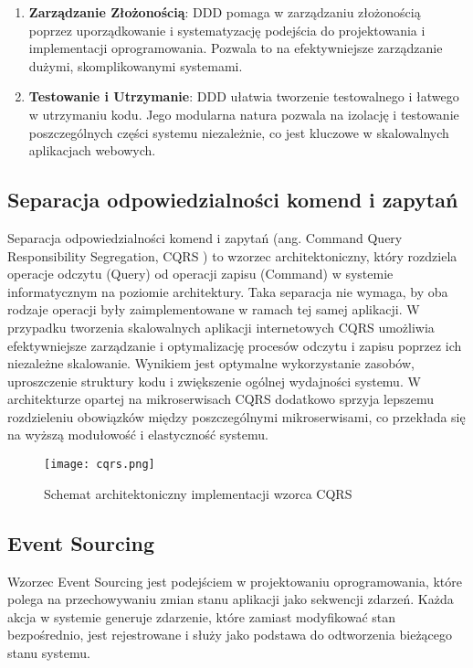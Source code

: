 \begin{enumerate}
    \item \textbf{Zarządzanie Złożonością}: DDD pomaga w zarządzaniu złożonością poprzez uporządkowanie i systematyzację podejścia do projektowania i implementacji oprogramowania. Pozwala to na efektywniejsze zarządzanie dużymi, skomplikowanymi systemami.

    \item \textbf{Testowanie i Utrzymanie}: DDD ułatwia tworzenie testowalnego i łatwego w utrzymaniu kodu. Jego modularna natura pozwala na izolację i testowanie poszczególnych części systemu niezależnie, co jest kluczowe w skalowalnych aplikacjach webowych.
\end{enumerate}

\subsection{Separacja odpowiedzialności komend i zapytań}

Separacja odpowiedzialności komend i zapytań (ang. Command Query Responsibility Segregation, CQRS \cite{cqrs}) to wzorzec architektoniczny, który rozdziela operacje odczytu (Query) od operacji zapisu (Command) w systemie informatycznym na poziomie architektury. Taka separacja nie wymaga, by oba rodzaje operacji były zaimplementowane w ramach tej samej aplikacji. W przypadku tworzenia skalowalnych aplikacji internetowych CQRS umożliwia efektywniejsze zarządzanie i optymalizację procesów odczytu i zapisu poprzez ich niezależne skalowanie. Wynikiem jest optymalne wykorzystanie zasobów, uproszczenie struktury kodu i zwiększenie ogólnej wydajności systemu. W architekturze opartej na mikroserwisach CQRS dodatkowo sprzyja lepszemu rozdzieleniu obowiązków między poszczególnymi mikroserwisami, co przekłada się na wyższą modułowość i elastyczność systemu.

\begin{figure}[!h]
    \centering \texttt{[image: cqrs.png]}
    \caption{Schemat architektoniczny implementacji wzorca CQRS}
\end{figure}

\subsection{Event Sourcing}

Wzorzec Event Sourcing \cite{eventsourcing} jest podejściem w projektowaniu oprogramowania, które polega na przechowywaniu zmian stanu aplikacji jako sekwencji zdarzeń. Każda akcja w systemie generuje zdarzenie, które zamiast modyfikować stan bezpośrednio, jest rejestrowane i służy jako podstawa do odtworzenia bieżącego stanu systemu.


